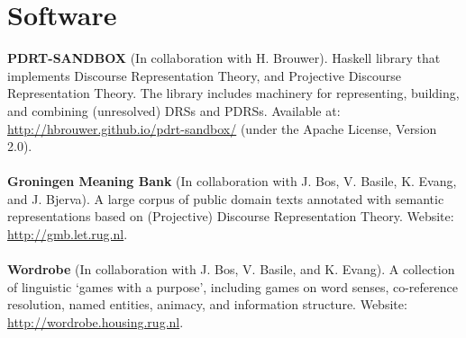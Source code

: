 \documentclass[a4paper,10pt]{article}
\def\leftcolwidth{.12\textwidth}
\begin{document}
\section*{Software}

\noindent
\textbf{PDRT-SANDBOX} (In collaboration with H. Brouwer). Haskell library that
    implements Discourse Representation Theory, and Projective Discourse
    Representation Theory. The library includes machinery for representing,
    building, and combining (unresolved) DRSs and PDRSs.
    Available at: \url{http://hbrouwer.github.io/pdrt-sandbox/} (under the
    Apache License, Version 2.0).\\
    \\
    \textbf{Groningen Meaning Bank} (In collaboration with J. Bos, V. Basile,
    K. Evang, and J. Bjerva). A large corpus of public domain texts annotated
    with semantic representations based on (Projective) Discourse Representation
    Theory. Website: \url{http://gmb.let.rug.nl}.\\
    \\
    \textbf{Wordrobe} (In collaboration with J. Bos, V. Basile, and
    K. Evang). A collection of linguistic `games with a purpose', including
    games on word senses, co-reference resolution, named entities, animacy, and
    information structure. Website: \url{http://wordrobe.housing.rug.nl}.




%
\end{document}
